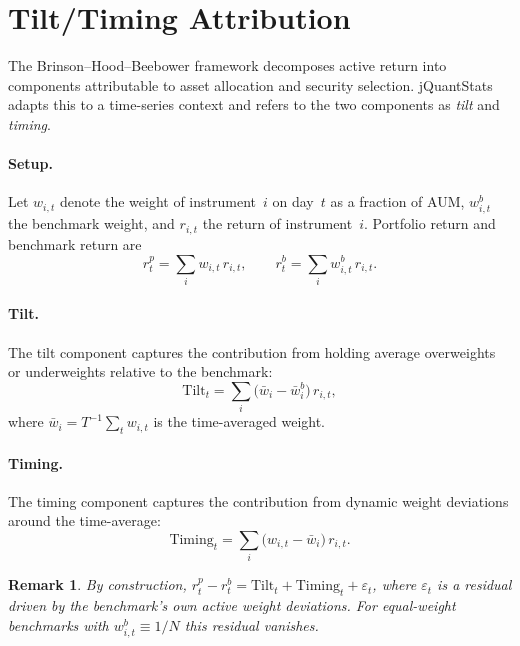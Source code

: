 \documentclass[11pt,a4paper]{article}
\newtheorem{remark}{Remark}
\begin{document}
\section{Tilt/Timing Attribution}
\label{sec:attribution}

The Brinson--Hood--Beebower \citep{brinson1986} framework decomposes active
return into components attributable to asset allocation and security selection.
jQuantStats adapts this to a time-series context and refers to the two
components as \emph{tilt} and \emph{timing}.

\paragraph{Setup.}
Let $w_{i,t}$ denote the weight of instrument~$i$ on day~$t$ as a fraction of
AUM, $w_{i,t}^b$ the benchmark weight, and $r_{i,t}$ the return of instrument~$i$.
Portfolio return and benchmark return are
\begin{equation}
  r_t^p = \sum_i w_{i,t}\,r_{i,t}, \qquad r_t^b = \sum_i w_{i,t}^b\,r_{i,t}.
\end{equation}

\paragraph{Tilt.}
The tilt component captures the contribution from holding average overweights
or underweights relative to the benchmark:
\begin{equation}
  \text{Tilt}_t = \sum_i \bigl(\bar{w}_i - \bar{w}_i^b\bigr)\,r_{i,t},
\end{equation}
where $\bar{w}_i = T^{-1}\sum_t w_{i,t}$ is the time-averaged weight.

\paragraph{Timing.}
The timing component captures the contribution from dynamic weight deviations
around the time-average:
\begin{equation}
  \text{Timing}_t = \sum_i \bigl(w_{i,t} - \bar{w}_i\bigr)\,r_{i,t}.
\end{equation}

\begin{remark}
By construction, $r_t^p - r_t^b = \text{Tilt}_t + \text{Timing}_t + \varepsilon_t$,
where $\varepsilon_t$ is a residual driven by the benchmark's own active
weight deviations.  For equal-weight benchmarks with $w_{i,t}^b \equiv 1/N$
this residual vanishes.
\end{remark}
\end{document}
